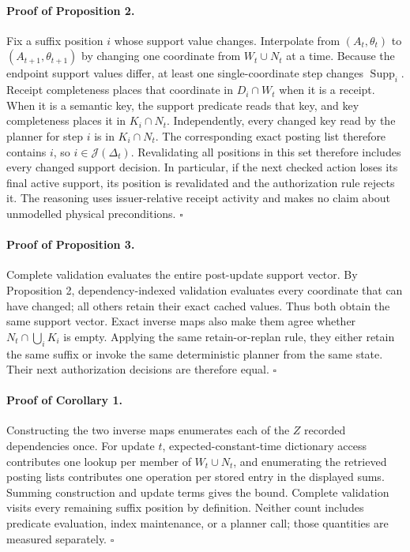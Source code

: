 \documentclass{article}
\begin{document}
\paragraph{Proof of Proposition 2.}
Fix a suffix position $i$ whose support value changes. Interpolate from
$(A_t,\theta_t)$ to $(A_{t+1},\theta_{t+1})$ by changing one coordinate from
$W_t\cup N_t$ at a time. Because the endpoint support values differ, at least
one single-coordinate step changes $\operatorname{Supp}_i$. Receipt completeness
places that coordinate in $D_i\cap W_t$ when it is a receipt. When it is a
semantic key, the support predicate reads that key, and key completeness places
it in $K_i\cap N_t$. Independently, every changed key read by the planner for
step $i$ is in $K_i\cap N_t$. The corresponding exact posting list therefore
contains $i$, so $i\in\mathcal J(\Delta_t)$.
Revalidating all
positions in this set therefore includes every changed support decision.  In
particular, if the next checked action loses its final active support, its
position is revalidated and the authorization rule rejects it.  The reasoning
uses issuer-relative receipt activity and makes no claim about unmodelled
physical preconditions. \hfill$\square$

\paragraph{Proof of Proposition 3.}
Complete validation evaluates the entire post-update support vector. By
Proposition 2, dependency-indexed validation evaluates every coordinate that
can have changed; all others retain their exact cached values. Thus both obtain
the same support vector. Exact inverse maps also make them agree whether
$N_t\cap\bigcup_i K_i$ is empty. Applying the same retain-or-replan rule, they
either retain the same suffix or invoke the same deterministic planner from the
same state. Their next authorization decisions are therefore equal.
\hfill$\square$

\paragraph{Proof of Corollary 1.}
Constructing the two inverse maps enumerates each of the $Z$ recorded
dependencies once.  For update $t$, expected-constant-time dictionary access
contributes one lookup per member of $W_t\cup N_t$, and enumerating the retrieved
posting lists contributes one operation per stored entry in the displayed
sums.  Summing construction and update terms gives the bound.  Complete
validation visits every remaining suffix position by definition.  Neither
count includes predicate evaluation, index maintenance, or a planner call;
those quantities are measured separately. \hfill$\square$
\end{document}
